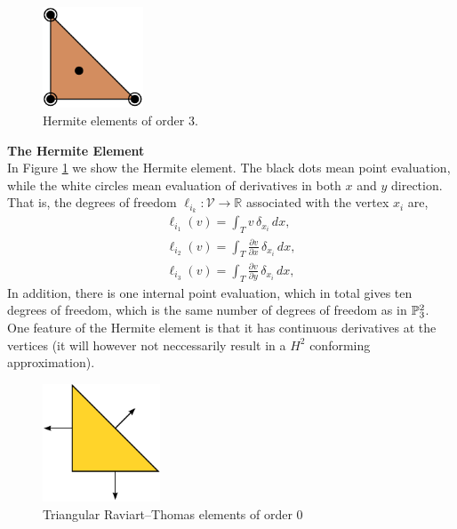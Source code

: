 \begin{figure}
  \begin{center}
    \includegraphics[height=3cm]{chapters/kirby-6/pdf/HER3.pdf}
    \caption{Hermite elements of order 3.}
    \label{Hermite}
  \end{center}
\end{figure}

\begin{example}{\bf{ The Hermite Element}} \\
In Figure \ref{Hermite} we show the Hermite element. The black dots mean point
evaluation, while the white circles mean evaluation of derivatives in both $x$ and
$y$ direction. 
That is, the degrees of freedom $\ell_{i_k} : \mathcal{V} \rightarrow \mathbb{R}$ 
associated with the vertex $x_i$ are,  
\begin{eqnarray}
\ell_{i_1} ( v) = \int_{T} {v} \, \delta_{x_i} \, dx,   \\
\ell_{i_2} ( v) = \int_{T} \frac{\partial{v}}{\partial x} \, \delta_{x_i} \, dx, \\  
\ell_{i_3} ( v) = \int_{T} \frac{\partial{v}}{\partial y} \, \delta_{x_i} \, dx,   
\end{eqnarray}
In addition, there is one internal point evaluation, which in total gives ten degrees of freedom, which is the same number
of degrees of freedom as in $\P^2_3$.  One feature of the Hermite element
is that it has continuous derivatives at the vertices (it will however
not neccessarily result in a $H^2$ conforming approximation).
\end{example}

\begin{figure}
  \begin{center}
    \includegraphics[height=3.5cm]{chapters/kirby-6/pdf/RT0.pdf} 
    \caption{Triangular Raviart--Thomas elements of order 0}
    \label{Raviart-Thomas}
  \end{center}
\end{figure}


